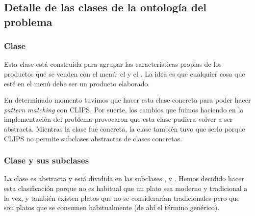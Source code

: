 \subsection{Detalle de las clases de la ontología del problema}
\subsubsection{Clase }
Esta clase está construida para agrupar las características propias de los
productos que se venden con el menú: el  y el
. La idea es que cualquier cosa que esté en el menú debe ser un
producto elaborado.

En determinado momento tuvimos que hacer esta clase concreta para poder hacer
\emph{pattern matching} con CLIPS. Por suerte, los cambios que fuimos haciendo
en la implementación del problema provocaron que esta clase pudiera volver a
ser abstracta. Mientras la clase fue concreta, la clase  también
tuvo que serlo porque CLIPS no permite subclases abstractas de clases
concretas.

\subsubsection{Clase  y sus subclases}
La clase es abstracta y está dividida en las subclases ,
 y . Hemos decidido hacer esta clasificación
porque no es habitual que un plato sea moderno y tradicional a la vez, y
también existen platos que no se considerarían tradicionales pero que son
platos que se consumen habitualmente (de ahí el término genérico).

